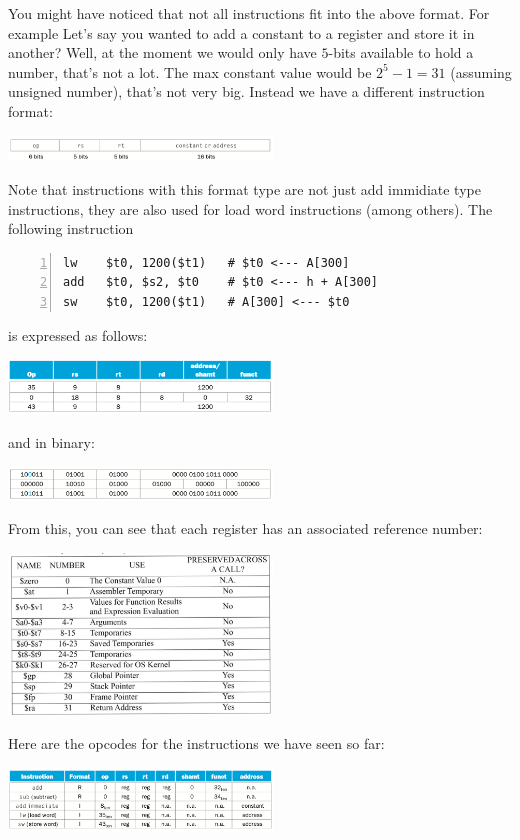 \documentclass[10pt]{article}
\begin{document}
You might have noticed that not all instructions fit into the above format.  For example Let's say you wanted to add a constant to a register and store it in another?  Well, at the moment we would only have $5$-bits available to hold a number, that's not a lot.  The max constant value would be $2^5 - 1 = 31$ (assuming unsigned number), that's not very big.  Instead we have a different instruction format:
\begin{center}
\includegraphics[width=7cm]{10.png}
\end{center}
Note that instructions with this format type are not just add immidiate type instructions, they are also used for load word instructions (among others). The following instruction 
\begin{lstlisting}[style=CStyle, numbers=left, xleftmargin=5.0ex, aboveskip=2em, belowskip=2em, numberstyle=\color{blue}, escapeinside=||]
lw    $t0, 1200($t1)   # $t0 <--- A[300]
add   $t0, $s2, $t0    # $t0 <--- h + A[300]
sw    $t0, 1200($t1)   # A[300] <--- $t0
\end{lstlisting}
is expressed as follows:
\begin{center}
\includegraphics[width=7cm]{11.png}
\end{center}
and in binary:
\begin{center}
\includegraphics[width=7cm]{12.png}
\end{center}
From this, you can see that each register has an associated reference number:
\begin{center}
\includegraphics[width=7cm]{13.png}
\end{center}
Here are the opcodes for the instructions we have seen so far:
\begin{center}
  \includegraphics[width=7cm]{14.png}
\end{center}
\end{document}
